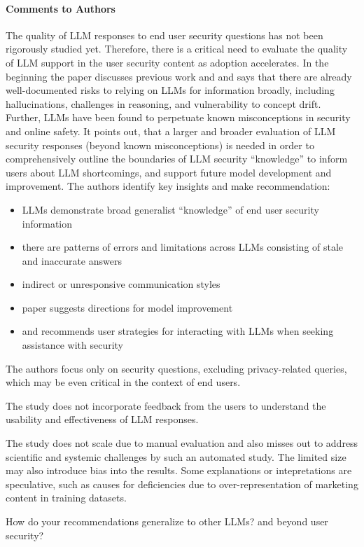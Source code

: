 \documentclass[letterpaper,twocolumn,10pt]{article}
\begin{document}
\paragraph{Comments to Authors}
The quality of LLM responses to end user security questions has not been rigorously studied yet. Therefore, there is a critical need to evaluate the quality of LLM support in the user security content as adoption accelerates. In the beginning the paper discusses previous work and and says that there are already well-documented risks to relying on LLMs for information broadly, including hallucinations, challenges in reasoning, and vulnerability to concept drift.
Further, LLMs have been found to perpetuate known misconceptions in security and online safety.
It points out, that a larger and broader evaluation of LLM security responses (beyond known misconceptions) is needed in order to comprehensively outline the boundaries of LLM security “knowledge” to inform users about LLM shortcomings, and support future model development and improvement. The authors identify key insights and make recommendation:
\begin{itemize}
\item LLMs demonstrate broad generalist “knowledge” of end user security information 
\item there are patterns of errors and limitations across LLMs consisting of stale and inaccurate answers
\item indirect or unresponsive communication styles
\item paper suggests directions for model improvement 
\item and recommends user strategies for interacting with LLMs when seeking assistance with security
\end{itemize}

The authors focus only on security questions, excluding privacy-related queries, which may be even critical in the context of end users.

The study does not incorporate feedback from the users to understand the usability and effectiveness of LLM responses.

The study does not scale due to manual evaluation and also misses out to address scientific and systemic challenges by such an automated study. The limited size may also introduce bias into the results. Some explanations or intepretations are speculative, such as causes for deficiencies due to over-representation of marketing content in training datasets.

How do your recommendations generalize to other LLMs? and beyond user security?
\end{document}
